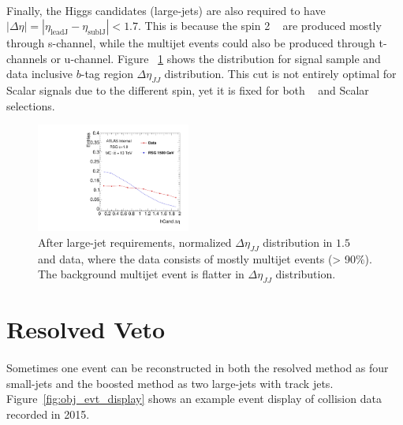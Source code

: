 \paragraph{}
Finally, the Higgs candidates (large-\R jets) are also required to have $|\Delta\eta| = |\eta_{\text{leadJ}} -\eta_{\text{sublJ}} |< 1.7$. 
This is because the spin 2 \Grav~ are produced mostly through s-channel, while the multijet events could also be produced through t-channels or u-channel. 
Figure ~\ref{fig:app-check-deta} shows the distribution for signal sample and data inclusive $b$-tag region $\Delta \eta_{JJ}$ distribution.
This cut is not entirely optimal for Scalar signals due to the different spin, yet it is fixed for both \Grav~ and Scalar selections.

\begin{figure}
\begin{center}
  \includegraphics[width=0.45\textwidth,angle=-90]{figures/boosted/Other/AllTag_Signal_hCandDeta_F_c10-cb-no-deta-cut_truth_0.pdf}
  \caption{ After large-\R jet requirements, normalized $\Delta \eta_{JJ}$ distribution in $1.5$ \TeV \Grav~ and data, where the data consists of mostly multijet events (> 90$\%$). The background multijet event is flatter in $\Delta \eta_{JJ}$ distribution.}
\label{fig:app-check-deta}
\end{center}
\end{figure}


\section{Resolved Veto}
\label{sec:resollvedveto}

\paragraph{}
Sometimes one event can be reconstructed in both the resolved method as four small-\R jets and the boosted method as two large-\R jets with track jets. Figure~\ref{fig:obj_evt_display} shows an example event display of collision data recorded in 2015.

